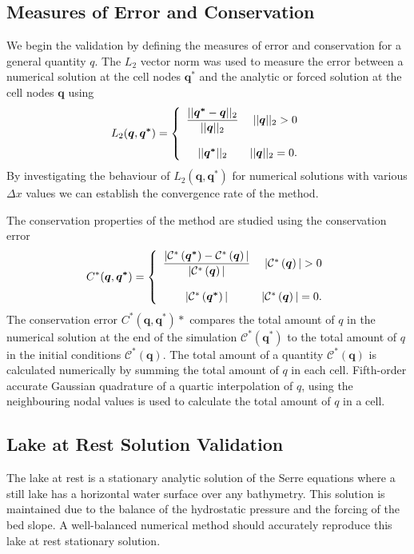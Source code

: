 \documentclass[AMA,STIX1COL]{WileyNJD-v2}
\newcommand{\vecn}[1]{\boldsymbol{#1}}
\begin{document}
\subsection{Measures of Error and Conservation}
We begin the validation by defining the measures of error and conservation for a general quantity $q$. The $L_2$ vector norm was used to measure the error between a numerical solution at the cell nodes $\vecn{q^*}$ and the analytic or forced solution at the cell nodes $\vecn{q}$ using
\begin{equation*}
L_2(\vecn{q},\vecn{q^*}) =  \left\lbrace \begin{array}{c r} 
\dfrac{||\vecn{q^*} - \vecn{q}||_{2}}{||\vecn{q}||_{2}} & ||\vecn{q}||_{2} > 0 \\ \\
{||\vecn{q^*}||_{2}} & ||\vecn{q}||_{2} = 0 . \end{array}\right. 
\label{eqn:L1qdef} 
\end{equation*} 
By investigating the behaviour of $L_2(\vecn{q},\vecn{q^*})$ for numerical solutions with various $\Delta x$ values we can establish the convergence rate of the method. 

The conservation properties of the method are studied using the conservation error
\begin{equation*}
C^*(\vecn{q},\vecn{q^*}) =  \left\lbrace \begin{array}{c r} 
\dfrac{|\mathcal{C}^*\left({\vecn{q^*}}\right) - \mathcal{C}^*\left({\vecn{q}}\right)| }{|\mathcal{C}^*\left({\vecn{q}}\right)|} & |\mathcal{C}^*\left({\vecn{q}}\right)| > 0 \\ \\
|\mathcal{C}^*\left({\vecn{q^*}}\right)| & |\mathcal{C}^*\left({\vecn{q}}\right)| = 0  . \end{array}\right. 
\end{equation*}
The conservation error $C^*(\vecn{q},\vecn{q^*})*$ compares the total amount of $q$ in the numerical solution at the end of the simulation $\mathcal{C}^*\left({\vecn{q^*}}\right)$ to the total amount of $q$ in the initial conditions $\mathcal{C}^*\left({\vecn{q}}\right)$. The total amount of a quantity $\mathcal{C}^*\left({\vecn{q}}\right)$ is calculated numerically by summing the total amount of $q$ in each cell. Fifth-order accurate Gaussian quadrature of a quartic interpolation of $q$, using the neighbouring nodal values is used to calculate the total amount of $q$ in a cell.

\subsection{Lake at Rest Solution Validation}
The lake at rest is a stationary analytic solution of the Serre equations where a still lake has a horizontal water surface over any bathymetry. This solution is maintained due to the balance of the hydrostatic pressure and the forcing of the bed slope. A well-balanced numerical method should accurately reproduce this lake at rest stationary solution.
\end{document}
